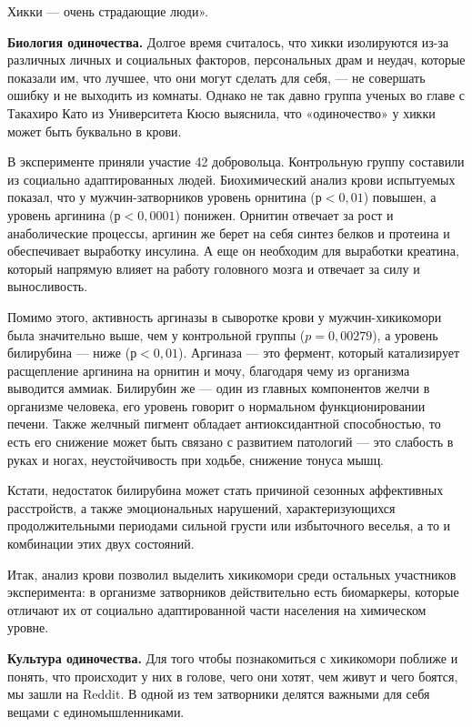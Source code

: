 Хикки — очень страдающие люди».


\setlength{\leftskip}{0pt}

\textbf{Биология одиночества.}
Долгое время считалось, что хикки изолируются из-за различных личных и социальных факторов, персональных драм и неудач, которые показали им, что лучшее, что они могут сделать для себя, — не совершать ошибку и не выходить из комнаты. Однако не так давно группа ученых во главе с Такахиро Като из Университета Кюсю выяснила, что «одиночество» у хикки может быть буквально в крови.

В эксперименте приняли участие 42 добровольца. Контрольную группу составили из социально адаптированных людей. Биохимический анализ крови испытуемых показал, что у мужчин-затворников уровень орнитина ($р < 0,01$) повышен, а уровень аргинина ($р < 0,0001$) понижен. Орнитин отвечает за рост и анаболические процессы, аргинин же берет на себя синтез белков и протеина и обеспечивает выработку инсулина. А еще он необходим для выработки креатина, который напрямую влияет на работу головного мозга и отвечает за силу и выносливость.

Помимо этого, активность аргиназы в сыворотке крови у мужчин-хикикомори была значительно выше, чем у контрольной группы ($p = 0,00279$), а уровень билирубина — ниже ($р < 0,01$). Аргиназа — это фермент, который катализирует расщепление аргинина на орнитин и мочу, благодаря чему из организма выводится аммиак. Билирубин же — один из главных компонентов желчи в организме человека, его уровень говорит о нормальном функционировании печени. Также желчный пигмент обладает антиоксидантной способностью, то есть его снижение может быть связано с развитием патологий — это слабость в руках и ногах, неустойчивость при ходьбе, снижение тонуса мышц.

Кстати, недостаток билирубина может стать причиной сезонных аффективных расстройств, а также эмоциональных нарушений, характеризующихся продолжительными периодами сильной грусти или избыточного веселья, а то и комбинации этих двух состояний.

Итак, анализ крови позволил выделить хикикомори среди остальных участников эксперимента: в организме затворников действительно есть биомаркеры, которые отличают их от социально адаптированной части населения на химическом уровне.

\textbf{Культура одиночества.}
Для того чтобы познакомиться с хикикомори поближе и понять, что происходит у них в голове, чего они хотят, чем живут и чего боятся, мы зашли на Reddit. В одной из тем затворники делятся важными для себя вещами с единомышленниками.

